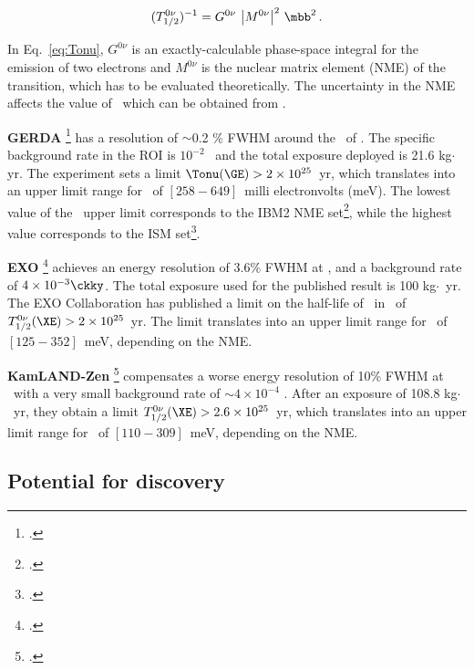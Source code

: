 \begin{equation}
(T^{0\nu}_{1/2})^{-1} = G^{0\nu} \ \big|M^{0\nu}\big|^{2} \ \mbb^{2} \, .
\label{eq:Tonu}
\end{equation}

In Eq.~\ref{eq:Tonu}, $G^{0\nu}$ is an exactly-calculable phase-space integral for the emission of two electrons and $M^{0\nu}$ is the nuclear matrix element (NME) of the transition, which has to be evaluated theoretically. The uncertainty in the NME affects the value of \mbb\ which can be obtained from \Tonu.
 
{\bf GERDA} \footcite{Agostini:2013mzu} has a resolution of $\sim$0.2 \% FWHM around the \Qbb\ of \GE. The specific background rate in the ROI is $10^{-2}$ \ckky\ and the total exposure deployed is 21.6 kg$\cdot$yr. The experiment sets a limit $\Tonu(\GE)> 2 \times 10^{25}$~yr, which translates into an upper limit range for \mbb\ of $[258-649]$~milli electronvolts (meV). The lowest value of the \mbb\ upper limit corresponds to the IBM2 NME set\footcite{Barea:2013bz}, while the highest value corresponds to the ISM set\footcite{Menendez:2008jp}.

{\bf EXO} \footcite{Albert:2014awa} achieves an energy resolution of 3.6\% FWHM at \Qbb, and a background rate of $ 4 \times 10^{-3}\ckky$. The total exposure used for the published result is 100 kg$\cdot$~yr. The EXO Collaboration has published a limit on the half-life of \bbonu\ in \XE\ of $T_{1/2}^{0\nu}(\XE) > 2 \times 10^{25}$~yr. The limit translates into an upper limit range for \mbb\ of $[125-352]$~meV, depending on the NME.

{\bf KamLAND-Zen} \footcite{TheKamLAND-Zen:2014lma} compensates a worse energy resolution of 10\% FWHM at \Qbb\ with a very small background rate of $\sim 4 \times 10^{-4}$ \ckky. After an exposure of 108.8 kg$\cdot$~yr, they obtain a limit  $T_{1/2}^{0\nu}(\XE) > 2.6 \times 10^{25}$~yr, which translates into an upper limit range for \mbb\ of $[110-309]$~meV, depending on the NME.

 \subsection{Potential for discovery}
 
